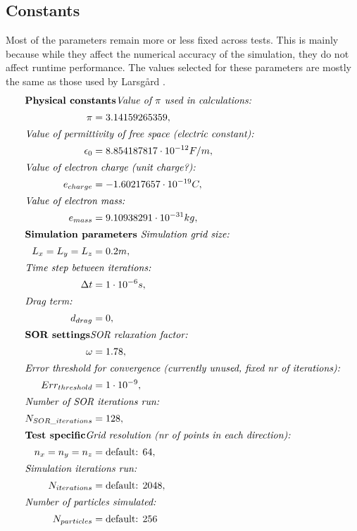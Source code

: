\subsection{Constants}
Most of the parameters remain more or less fixed across tests. This is mainly because while they affect the numerical
accuracy of the simulation, they do not affect runtime performance. The values selected for these parameters are mostly
the same as those used by Larsgård \cite{larsgaard07}.
\begin{align*}
\intertext{\textbf{Physical constants}\newline
	\textit{Value of $\pi$ used in calculations:}}
		\pi &= 3.14159265359,\\
	\intertext{\textit{Value of permittivity of free space (electric constant):}}
		\epsilon_0 &= 8.854187817 \cdot 10^{-12 } F/m,\\
	\intertext{\textit{Value of electron charge (unit charge?):}}
		e_{charge} &= -1.60217657 \cdot 10^{-19 } C,\\
	\intertext{\textit{Value of electron mass:}}
		e_{mass} &= 9.10938291 \cdot 10^{-31 } kg,\\
\intertext{\textbf{Simulation parameters}\newline
	\textit{ Simulation grid size:}}
		L_x = L_y = L_z &= 0.2 m,\\
	\intertext{\textit{Time step between iterations:}}
		\Delta t &= 1 \cdot 10^{-6 } s,\\
	\intertext{\textit{Drag term:}}
		d_{drag} &= 0,\\
\intertext{\textbf{SOR settings}\newline
	\textit{SOR relaxation factor:}}
		\omega &= 1.78,\\
	\intertext{\textit{Error threshold for convergence (currently unused, fixed nr of iterations):}}
		Err_{threshold} &= 1 \cdot 10^{-9},\\
	\intertext{\textit{Number of SOR iterations run:}}
		N_{SOR\_iterations} &= 128,\\
\intertext{\textbf{Test specific}\newline
	\textit{Grid resolution (nr of points in each direction):}}
		n_x = n_y = n_z &= \text{default: } 64,\\
	\intertext{\textit{Simulation iterations run:}}
		N_{iterations} &= \text{default: } 2048,\\
	\intertext{\textit{Number of particles simulated:}}
		N_{particles} &= \text{default: } 256
\end{align*}

